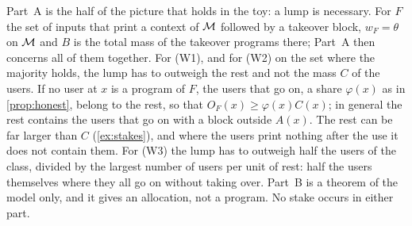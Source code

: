 Part~A is the half of the picture that holds in the toy: a lump is necessary. For $F$ the set of inputs that
print a context of $\mathcal M$ followed by a takeover block, $w_F=\theta$ on $\mathcal M$ and $B$ is the total mass of the
takeover programs there; Part~A then concerns all of them together. For (W1), and for (W2) on the set where
the majority holds, the lump has to outweigh the rest and not the mass $C$ of the users. If no user at $x$ is
a program of $F$, the users that go on, a share $\varphi(x)$ as in \cref{prop:honest}, belong to the rest, so
that $O_F(x)\ge\varphi(x)C(x)$; in general the rest contains the users that go on with a block outside $A(x)$.
The rest can be far larger than $C$ (\cref{ex:stakes}), and where the users print nothing after the use it
does not contain them. For (W3) the lump has to outweigh half the users of the class, divided by the largest
number of users per unit of rest: half the users themselves where they all go on without taking over. Part~B
is a theorem of the model only, and it gives an allocation, not a program. No stake occurs in either part.

